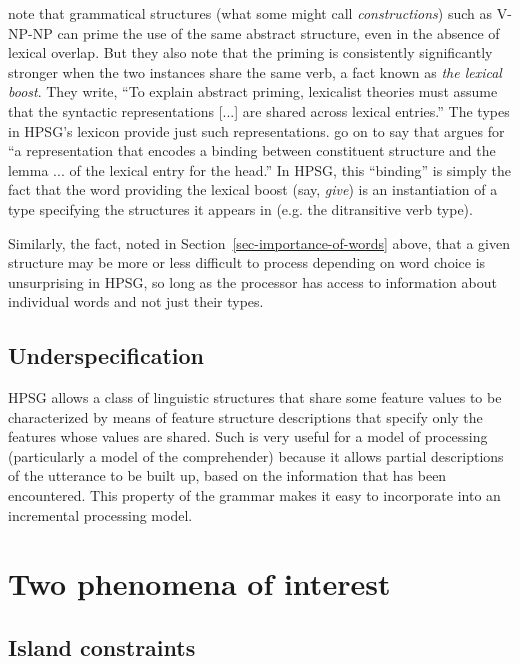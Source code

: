 \documentclass[output=paper
	        ,collection
	        ,collectionchapter
 	        ,biblatex
                ,babelshorthands
                ,newtxmath
                ,draftmode
                ,colorlinks, citecolor=brown
]{langscibook}
\begin{document}
\citet{BraniganPickering2017} note that grammatical structures (what some might call
\emph{constructions}) such as V-NP-NP can prime the use of the same abstract
structure, even in the absence of lexical overlap.  But they also note that the priming is
consistently significantly stronger when the two instances share the same verb, a fact known as
\emph{the lexical boost}.  They write, ``To explain abstract priming, lexicalist
theories must assume that the syntactic representations [...]  are shared across lexical entries.''
The types in HPSG's lexicon provide just such representations. \citeauthor{BraniganPickering2017} go
on to say that  argues for ``a representation that encodes a binding between
constituent structure and the lemma ... of the lexical entry for the head.''  In HPSG, this
``binding'' is simply the fact that the word providing the lexical boost (say, \emph{give}) is an
instantiation of a type specifying the structures it appears in (e.g. the ditransitive verb
type).

Similarly, the fact, noted in Section~\ref{sec-importance-of-words} above, that a given structure may be more or less difficult to process depending on word choice is unsurprising in HPSG, so long as the processor has access to information about individual words and not just their types.   
\subsection{Underspecification}

HPSG allows a class of linguistic structures that share some feature values to be characterized by means of feature structure descriptions that specify only the features whose values are shared.  Such  is very useful for a model of processing (particularly a model of the comprehender) because it allows partial descriptions of the utterance to be built up, based on the information that has been encountered.  This property of the grammar makes it easy to incorporate into an incremental processing model.

\section{Two phenomena of interest}
\label{sec-phenomena-processing}

\subsection{Island constraints}
\end{document}
